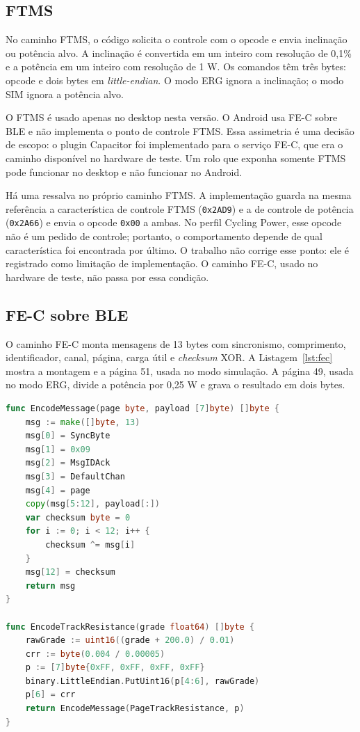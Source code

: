 \subsection{FTMS}
\label{sec:implementacao-ftms}

No caminho FTMS, o código solicita o controle com o opcode  e envia
inclinação ou potência alvo. A inclinação é convertida em um inteiro com
resolução de 0,1\% e a potência em um inteiro com resolução de 1 W. Os comandos
têm três bytes: opcode e dois bytes em \textit{little-endian}. O modo ERG ignora
a inclinação; o modo SIM ignora a potência alvo.

O FTMS é usado apenas no desktop nesta versão. O Android usa FE-C sobre BLE e
não implementa o ponto de controle FTMS. Essa assimetria é uma decisão de
escopo: o plugin Capacitor foi implementado para o serviço FE-C, que era o
caminho disponível no hardware de teste. Um rolo que exponha somente FTMS
pode funcionar no desktop e não funcionar no Android.

Há uma ressalva no próprio caminho FTMS. A implementação guarda na mesma
referência a característica de controle FTMS (\texttt{0x2AD9}) e a de controle
de potência (\texttt{0x2A66}) e envia o opcode \texttt{0x00} a ambas. No perfil
Cycling Power, esse opcode não é um pedido de controle; portanto, o comportamento
depende de qual característica foi encontrada por último. O trabalho não corrige
esse ponto: ele é registrado como limitação de implementação. O caminho FE-C,
usado no hardware de teste, não passa por essa condição.

\subsection{FE-C sobre BLE}
\label{sec:implementacao-fec}

O caminho FE-C monta mensagens de 13 bytes com sincronismo, comprimento,
identificador, canal, página, carga útil e \textit{checksum} XOR. A
Listagem~\ref{lst:fec} mostra a montagem e a página 51, usada no modo
simulação. A página 49, usada no modo ERG, divide a potência por 0,25 W e grava
o resultado em dois bytes.

\begin{lstlisting}[language=Go, float=htbp, caption={Montagem de mensagem FE-C e página de resistência de pista}, label={lst:fec}]
func EncodeMessage(page byte, payload [7]byte) []byte {
    msg := make([]byte, 13)
    msg[0] = SyncByte
    msg[1] = 0x09
    msg[2] = MsgIDAck
    msg[3] = DefaultChan
    msg[4] = page
    copy(msg[5:12], payload[:])
    var checksum byte = 0
    for i := 0; i < 12; i++ {
        checksum ^= msg[i]
    }
    msg[12] = checksum
    return msg
}

func EncodeTrackResistance(grade float64) []byte {
    rawGrade := uint16((grade + 200.0) / 0.01)
    crr := byte(0.004 / 0.00005)
    p := [7]byte{0xFF, 0xFF, 0xFF, 0xFF}
    binary.LittleEndian.PutUint16(p[4:6], rawGrade)
    p[6] = crr
    return EncodeMessage(PageTrackResistance, p)
}
\end{lstlisting}

